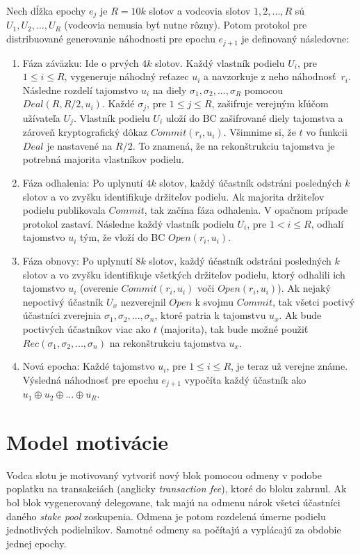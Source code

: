 Nech dĺžka epochy $e_j$ je $R=10k$ slotov a vodcovia slotov $1,2,...,R$ sú $U_1, U_2, ..., U_R$ (vodcovia nemusia byť nutne rôzny). Potom protokol pre distribuované generovanie náhodnosti pre epochu $e_{j+1}$ je definovaný následovne:
\begin{enumerate}
	\item Fáza záväzku: Ide o prvých $4k$ slotov. Každý vlastník podielu $U_i$, pre $1 \leq i \leq R$, vygeneruje náhodný reťazec $u_i$ a navzorkuje z neho náhodnosť~$r_i$. Následne rozdelí tajomstvo $u_i$ na diely $\sigma_1, \sigma_2, ..., \sigma_R$ pomocou $Deal(R,R/2,u_i)$. Každé $\sigma_j$, pre $1 \leq j \leq R$, zašifruje verejným kľúčom užívateľa $U_j$. Vlastník podielu $U_i$ uloží do BC zašifrované diely tajomstva a zároveň kryptografický dôkaz $Commit(r_i, u_i)$. Všimnime si, že $t$ vo funkcii $Deal$ je nastavené na $R/2$. To znamená, že na rekonštrukciu tajomstva je potrebná majorita vlastníkov podielu.
	\item Fáza odhalenia: Po uplynutí $4k$ slotov, každý účastník odstráni posledných $k$ slotov a vo zvyšku identifikuje držiteľov podielu. Ak majorita držiteľov podielu publikovala $Commit$, tak začína fáza odhalenia. V opačnom prípade protokol zastaví. Následne každý vlastník podielu $U_i$, pre $1 < i \leq R$, odhalí tajomstvo $u_i$ tým, že vloží do BC $Open(r_i, u_i)$.
	\item Fáza obnovy: Po uplynutí $8k$ slotov, každý účastník odstráni posledných $k$ slotov a vo zvyšku identifikuje všetkých držiteľov podielu, ktorý odhalili ich tajomstvo $u_i$ (overenie $Commit(r_i, u_i)$ voči $Open(r_i, u_i)$). Ak nejaký nepoctivý účastník $U_x$ nezverejnil $Open$ k svojmu $Commit$, tak všetci poctivý účastníci zverejnia  $\sigma_1, \sigma_2, ..., \sigma_n$, ktoré patria k tajomstvu $u_x$. Ak bude poctivých účastníkov viac ako $t$ (majorita), tak bude možné použiť $Rec(\sigma_1, \sigma_2, ..., \sigma_n)$ na rekonštrukciu tajomstva $u_x$.
	\item Nová epocha: Každé tajomstvo $u_i$, pre $1 \leq i \leq R$, je teraz už verejne známe. Výsledná náhodnosť pre epochu $e_{j+1}$ vypočíta každý účastník ako $u_1 \oplus u_2 \oplus ... \oplus u_R$.
\end{enumerate}


\section{Model motivácie}

Vodca slotu je motivovaný vytvoriť nový blok pomocou odmeny v podobe poplatku na transakciách (anglicky \textit{transaction fee}), ktoré do bloku zahrnul. Ak bol blok vygenerovaný delegovane, tak majú na odmenu nárok všetci účastníci daného \textit{stake pool} zoskupenia. Odmena je potom rozdelená úmerne podielu jednotlivých podielnikov. Samotné odmeny sa počítajú a vyplácajú za obdobie jednej epochy.

